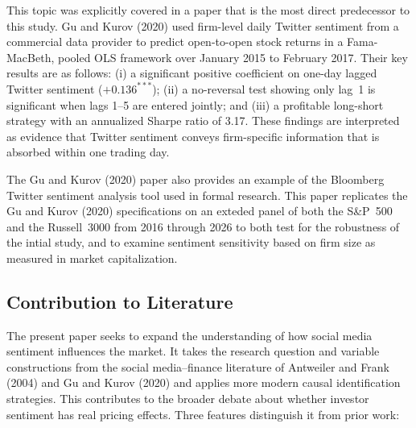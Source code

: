 This topic was explicitly covered in a paper that is the most direct
predecessor to this study. Gu and Kurov (2020) used firm-level daily
Twitter sentiment from a commercial data provider to predict
open-to-open stock returns in a Fama-MacBeth, pooled OLS framework over
January 2015 to February 2017. Their key results are as follows: (i) a
significant positive coefficient on one-day lagged Twitter sentiment
(\(+ {0.136}^{***}\)); (ii) a no-reversal test showing only lag~1 is
significant when lags 1--5 are entered jointly; and (iii) a profitable
long-short strategy with an annualized Sharpe ratio of 3.17. These
findings are interpreted as evidence that Twitter sentiment conveys
firm-specific information that is absorbed within one trading day.

The Gu and Kurov (2020) paper also provides an example of the Bloomberg Twitter
sentiment analysis tool used in formal research. %
This paper replicates
the Gu and Kurov (2020) specifications on an exteded panel of both the S&P~500 and the Russell~3000 from 2016 through 2026 to both test for the robustness of the intial study, and to examine sentiment sensitivity based on firm size as measured in market capitalization.

\subsection{Contribution to
Literature}\label{contribution-to-literature}

The present paper seeks to expand the understanding of how social media
sentiment influences the market. It takes the research question and
variable constructions from the social media--finance literature of
Antweiler and Frank (2004) and Gu and Kurov (2020) and applies more modern causal
identification strategies. This contributes to the broader debate about
whether investor sentiment has real pricing effects. Three features
distinguish it from prior work:

